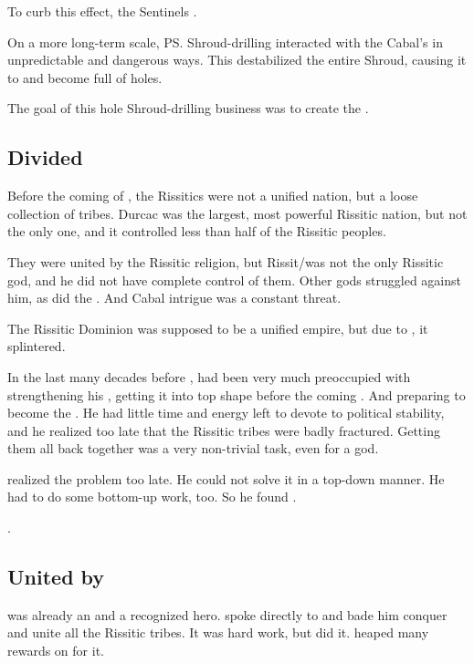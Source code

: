 To curb this effect, the Sentinels . 

On a more long-term scale, \ps{\Secherdamon} Shroud-drilling interacted with the Cabal's  in unpredictable and dangerous ways. 
This destabilized the entire Shroud, causing it to  and become full of holes. 

%
The goal of this hole Shroud-drilling business was to create the . 





\subsection{Divided}
Before the coming of , the Rissitics were not a unified nation, but a loose collection of tribes.
Durcac was the largest, most powerful Rissitic nation, but not the only one, and it controlled less than half of the Rissitic peoples.

They were united by the Rissitic religion, but Rissit/\Secherdamon was not the only Rissitic god, and he did not have complete control of them.
Other gods struggled against him, as did the \jinn. 
And Cabal intrigue was a constant threat. 

The Rissitic Dominion was supposed to be a unified empire, but due to , it splintered.

In the last many decades before \SentinelsofMithEmph, \Secherdamon had been very much preoccupied with strengthening his \matrix, getting it into top shape before the coming \thirdbanewar.
And preparing \Vizsherioch to become the . 
He had little time and energy left to devote to political stability, and he realized too late that the Rissitic tribes were badly fractured.
Getting them all back together was a very non-trivial task, even for a god. 

\Secherdamon realized the problem too late. 
He could not solve it in a top-down manner. 
He had to do some bottom-up work, too.
So he found \Narkiza. 

. 





\subsection{United by \Narkiza}
\Narkiza was already an \Ashenoch and a recognized hero.
\Secherdamon spoke directly to \Narkiza and bade him conquer and unite all the Rissitic tribes. 
It was hard work, but \Narkiza did it.
\Secherdamon heaped many rewards on \Narkiza for it. 



